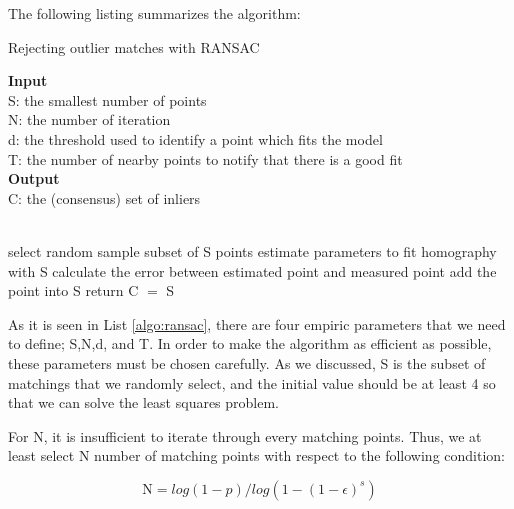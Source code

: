 \documentclass[12pt]{report}
\numberwithin{figure}{section}
\begin{document}
\begin{appendices}
The following listing summarizes the algorithm:

\begin{algorithm}[H]
	\caption{Rejecting outlier matches with RANSAC}
	\label{algo:ransac}
	\textbf{Input} \\
	\hspace*{\algorithmicindent}S: the smallest number of points\\
	\hspace*{\algorithmicindent}N: the number of iteration\\
	\hspace*{\algorithmicindent}d: the threshold used to identify a point 
	which fits the model\\
	\hspace*{\algorithmicindent}T: the number of nearby points to notify that 
	there is a good fit\\
	\textbf{Output} \\
	\hspace*{\algorithmicindent}C: the (consensus) set of inliers \\
	\begin{algorithmic}[1]
		
		\\
		\State select random sample subset of S points
		\State estimate parameters to fit homography with S
		\State calculate the error between estimated point and measured point
		\State add the point into S
		\EndIf
		\State return C $=$ S
		\EndIf
		\EndFor
		\EndWhile
		\EndProcedure
	\end{algorithmic}
\end{algorithm}

As it is seen in List \ref{algo:ransac}, there are four empiric parameters 
that we 
need to define; S,N,d, and T. In order to make the algorithm as efficient as 
possible, these parameters must be chosen carefully. As we discussed, S is the 
subset of matchings that we randomly select, and the initial value should be 
at 
least 4 so that we can solve the least squares problem. 

For N, it is insufficient to iterate through every matching points. Thus, we 
at least select N number of matching points with respect to the following 
condition:

\begin{equation}
\text{N} = log(1-p)/log(1-(1-\epsilon)^s)
\end{equation}


\end{appendices}
\end{document}
